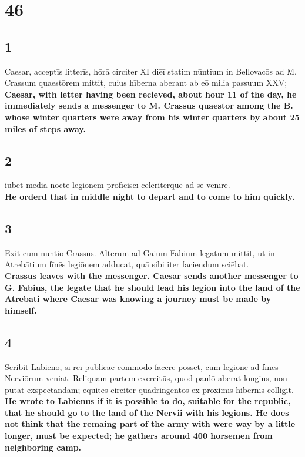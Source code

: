 \documentclass{article}
\begin{document}
\section*{46}

\subsection*{1}
Caesar, acceptīs litterīs, hōrā circiter XI diēī statim nūntium in Bellovacōs ad M. Crassum quaestōrem mittit, cuius hīberna aberant ab eō milia passuum XXV;\\
\textbf{Caesar, with letter having been recieved, about hour 11 of the day, he immediately sends a messenger to M. Crassus quaestor among the B. whose winter quarters were away from his winter quarters by about 25 miles of steps away.}

\subsection*{2}
iubet mediā nocte legiōnem profīciscī celeriterque ad sē venīre.\\
\textbf{He orderd that in middle night to depart and to come to him quickly.}

\subsection*{3}
Exit cum nūntiō Crassus. Alterum ad Gaium Fabium lēgātum mittit, ut in Atrebātium fīnēs legiōnem adducat, quā sibi iter faciendum sciēbat. \\
\textbf{Crassus leaves with the messenger. Caesar sends another messenger to G. Fabius, the legate that he should lead his legion into the land of the Atrebati where Caesar was knowing a journey must be made by himself.}

\subsection*{4}
Scribit Labiēnō, sī reī pūblicae commodō facere posset, cum legiōne ad fīnēs Nerviōrum veniat. Reliquam partem exercitūs, quod paulō aberat longius, non putat exspectandam; equitēs circiter quadringentōs ex proximīs hibernīs colligit.\\
\textbf{He wrote to Labienus if it is possible to do, suitable for the republic, that he should go to the land of the Nervii with his legions. He does not think that the remaing part of the army with were way by a little longer, must be expected; he gathers around 400 horsemen from neighboring camp.}
\end{document}
